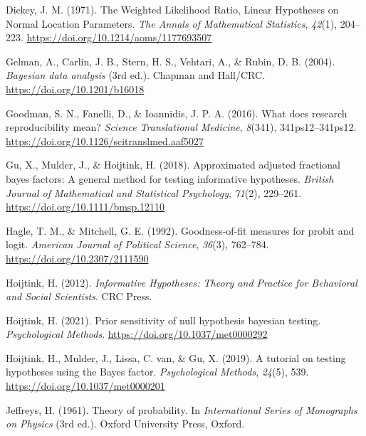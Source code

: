 \documentclass[
]{interact}
\newlength{\cslhangindent}
\newlength{\cslentryspacingunit} %
\newenvironment{CSLReferences}[2] %
 {%
  \setlength{\parindent}{0pt}
  \ifodd #1
  \let\oldpar\par
  \def\par{\hangindent=\cslhangindent\oldpar}
  \fi
  \setlength{\parskip}{#2\cslentryspacingunit}
 }%
 {}
\begin{document}
\begin{CSLReferences}{1}{0}
\leavevmode{}%
Dickey, J. M. (1971). {The Weighted Likelihood Ratio, Linear Hypotheses
on Normal Location Parameters}. \emph{The Annals of Mathematical
Statistics}, \emph{42}(1), 204--223.
\url{https://doi.org/10.1214/aoms/1177693507}

\leavevmode{}%
Gelman, A., Carlin, J. B., Stern, H. S., Vehtari, A., \& Rubin, D. B.
(2004). \emph{Bayesian data analysis} (3rd ed.). {Chapman and Hall/CRC}.
\url{https://doi.org/10.1201/b16018}

\leavevmode{}%
Goodman, S. N., Fanelli, D., \& Ioannidis, J. P. A. (2016). What does
research reproducibility mean? \emph{Science Translational Medicine},
\emph{8}(341), 341ps12--341ps12.
\url{https://doi.org/10.1126/scitranslmed.aaf5027}

\leavevmode{}%
Gu, X., Mulder, J., \& Hoijtink, H. (2018). Approximated adjusted
fractional bayes factors: A general method for testing informative
hypotheses. \emph{British Journal of Mathematical and Statistical
Psychology}, \emph{71}(2), 229--261.
\url{https://doi.org/10.1111/bmsp.12110}

\leavevmode{}%
Hagle, T. M., \& Mitchell, G. E. (1992). Goodness-of-fit measures for
probit and logit. \emph{American Journal of Political Science},
\emph{36}(3), 762--784. \url{https://doi.org/10.2307/2111590}

\leavevmode{}%
Hoijtink, H. (2012). \emph{Informative {H}ypotheses: {T}heory and
{P}ractice for {B}ehavioral and {S}ocial {S}cientists}. CRC Press.

\leavevmode{}%
Hoijtink, H. (2021). Prior sensitivity of null hypothesis bayesian
testing. \emph{Psychological Methods}.
\url{https://doi.org/10.1037/met0000292}

\leavevmode{}%
Hoijtink, H., Mulder, J., Lissa, C. van, \& Gu, X. (2019). A tutorial on
testing hypotheses using the {B}ayes factor. \emph{Psychological
Methods}, \emph{24}(5), 539. \url{https://doi.org/10.1037/met0000201}

\leavevmode{}%
Jeffreys, H. (1961). {Theory of probability}. In \emph{{International
Series of Monographs on Physics}} (3rd ed.). Oxford University Press,
Oxford.


\end{CSLReferences}
\end{document}
